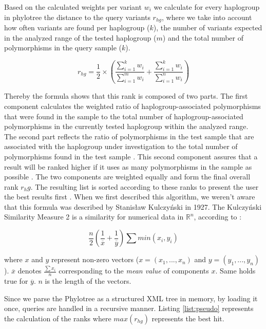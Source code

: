 Based on the calculated weights per variant $w_i$ we calculate for every haplogroup in phylotree the distance to the query variants $r_{hg}$, where we take into account how often variants are found per haplogroup ($k$), the number of variants expected in the analyzed range of the tested haplogroup ($m$) and the total number of polymorphisms in the query sample ($k$).

\begin{equation}
	r_{hg} = \frac{1}{2} \times \left(\frac{\sum^{k}_{i=1} w_i}{\sum^{m}_{i=1} w_i} + \frac{\sum^{k}_{i=1} w_i}{\sum^{n}_{i=1} w_i}\right)
\end{equation}

Thereby the formula shows that this rank is composed of two parts. The first component calculates the weighted ratio of haplogroup-associated polymorphisms that were found in the sample to the total number of haplogroup-associated polymorphisms in the currently tested haplogroup within the analyzed range. The second part reflects the ratio of polymorphisms in the test sample that are associated with the haplogroup under investigation to the total number of polymorphisms found in the test sample \cite{Kloss-Brandstatter2011}. This second component assures that a result will be ranked higher if it uses as many polymorphisms in the sample as possible \cite{Kloss-Brandstatter2011}. The two components are weighted equally and form the final overall rank $r_hg$. The resulting list is sorted according to these ranks to present the user the best results first  \cite{Kloss-Brandstatter2011}. When we first described this algorithm, we weren't aware that this formula was described by Stanisław Kulczyński in 1927. The Kulczyński Similarity Measure 2 is a similarity for numerical data in $\mathbb{R}^n$, according to \cite{Deza2009}:
 
\begin{equation}
\frac{n}{2}\left(\frac{1}{\overline x}+\frac{1}{\overline y}\right) \sum{min(x_i, y_i)}
\end{equation}

where $x$ and $y$ represent non-zero vectors ($x=(x_1,...,x_n)$ and $y=(y_1,...,y_n)$). $\overline x$ denotes $\frac{\sum{x_i}}{n}$ corresponding to the \textit{mean value} of components $x$. Same holds true for $\overline y$. $n$ is the length of the vectors.

Since we parse the Phylotree as a structured XML tree in memory, by loading it once, queries are handled in a recursive manner. Listing \ref{list:pseudo} represents the calculation of the ranks where $max(r_{hg})$ represents the best hit.

